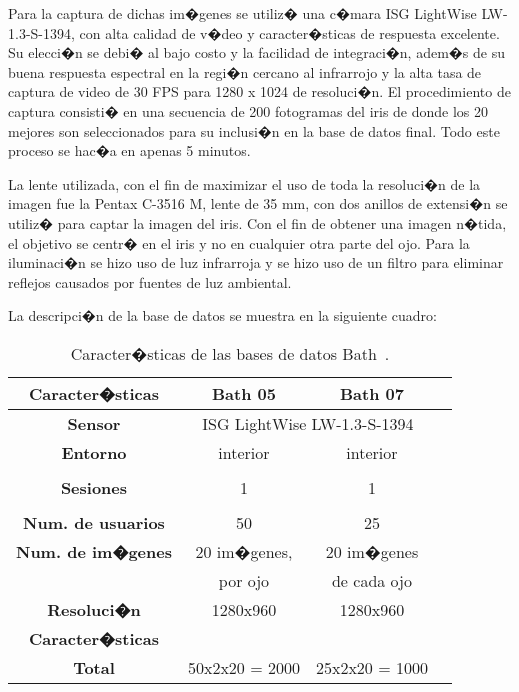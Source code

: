 Para la captura de dichas im�genes se utiliz� una c�mara ISG LightWise LW-1.3-S-1394, con alta calidad de v�deo y caracter�sticas de respuesta excelente. Su elecci�n se debi� al bajo costo y la facilidad de integraci�n, adem�s de su buena respuesta espectral en la regi�n cercano al infrarrojo y la alta tasa de captura de video de 30 FPS para 1280 x 1024 de resoluci�n. El procedimiento de captura consisti� en una secuencia de 200 fotogramas del iris de donde los 20 mejores son seleccionados para su inclusi�n en la base de datos final. Todo este proceso se hac�a en apenas 5 minutos.

La lente utilizada, con el fin de maximizar el uso de toda la resoluci�n de la imagen fue la Pentax C-3516 M, lente de 35 mm, con dos anillos de extensi�n se utiliz� para captar la imagen del iris. Con el fin de obtener una imagen n�tida, el objetivo se centr� en el iris y no en cualquier otra parte del ojo. Para la iluminaci�n se hizo uso de luz infrarroja y se hizo uso de un filtro para eliminar reflejos causados por fuentes de luz ambiental.

La descripci�n de la base de datos se muestra en la siguiente cuadro:

\vspace{1cm}

\begin{table}[h]
    \centering
    \scriptsize
    \begin{tabular}{|c|c|c|c|}
        \hline
        \textbf{Caracter�sticas}   & \textbf{Bath 05}      &  \textbf{Bath 07}       \\
        \hline
        \textbf{Sensor}            & \multicolumn{2}{|c|}{ISG LightWise LW-1.3-S-1394}\\
        \hline
        \textbf{Entorno}           & interior               & interior        \\
        \hline
                                   &                        &                 \\
        \textbf{Sesiones}          & 1                      & 1               \\
                                   &                        &              \\
        \hline
        \textbf{Num. de usuarios}  & 50                     & 25              \\
        \hline
        \textbf{Num. de im�genes}  & 20 im�genes,           & 20 im�genes  \\
                                   & por ojo                & de cada ojo \\
        \hline
        \textbf{Resoluci�n}        & 1280x960                & 1280x960         \\
        \hline
        \textbf{Caracter�sticas}   &                        &                 \\
        \hline
        \textbf{Total}             & 50x2x20 = 2000       & 25x2x20 = 1000    \\
        \hline
    \end{tabular}
    \caption{Caracter�sticas de las bases de datos Bath~\citet{database:UniversityBath_web}.}
    \label{table:info_bath}
\end{table}


